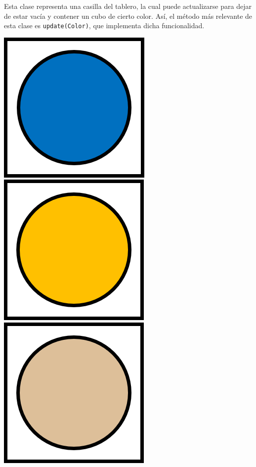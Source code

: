\documentclass[12pt,a4paper,openright]{book}
\theoremstyle{break}
\begin{document}
Esta clase representa una casilla del tablero, la cual puede actualizarse para dejar de estar vacía y contener un cubo de cierto color. Así, el método más relevante de esta clase es \texttt{update(Color)}, que implementa dicha funcionalidad.

\begin{center}
\includegraphics[scale=0.65]{blueCube.png}
\includegraphics[scale=0.65]{orangeCube.png}
\includegraphics[scale=0.65]{beigeCube.png}

\end{center}
\end{document}
